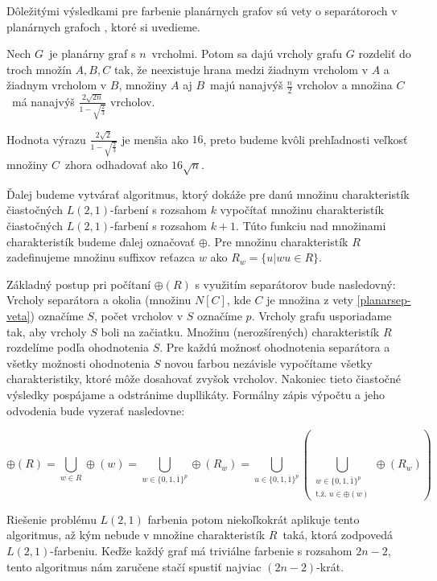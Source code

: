 Dôležitými výsledkami pre farbenie planárnych grafov sú vety o separátoroch v planárnych grafoch \cite{tarjan_plansep},
ktoré si uvedieme.

\begin{veta}
    \label{planarsep-veta}
    Nech $G$ je planárny graf s $n$ vrcholmi. Potom sa dajú vrcholy grafu $G$ rozdeliť do troch množín $A, B, C$ tak,
    že neexistuje hrana medzi žiadnym vrcholom v $A$ a žiadnym vrcholom v $B$, množiny $A$ aj $B$ majú nanajvýš $\frac{n}{2}$
    vrcholov a množina $C$ má nanajvýš $\frac{2 \sqrt{2n}}{1 - \sqrt{\frac{2}{3}}}$ vrcholov.
\end{veta}

\begin{pozn}
Hodnota výrazu $\frac{2 \sqrt{2}}{1 - \sqrt{\frac{2}{3}}}$ je menšia ako $16$, preto budeme kvôli prehľadnosti
veľkosť množiny $C$ zhora odhadovať ako $16 \sqrt{n}$.
\end{pozn}

Ďalej budeme vytvárať algoritmus, ktorý dokáže pre danú množinu charakteristík čiastočných $L(2,1)$-farbení
s rozsahom $k$ vypočítať množinu charakteristík čiastočných $L(2,1)$-farbení s rozsahom $k+1$. Túto funkciu
nad množinami charakteristík budeme ďalej označovať $\oplus$. Pre množinu charakteristík $R$ zadefinujeme
množinu suffixov reťazca $w$ ako $R_w = \{u | wu \in R \}$.

Základný postup pri počítaní $\oplus(R)$ s využitím separátorov bude nasledovný:
Vrcholy separátora a okolia (množinu $N[C]$, kde $C$ je množina z vety \ref{planarsep-veta})
označíme $S$, počet vrcholov v $S$ označíme $p$. Vrcholy grafu usporiadame tak, aby vrcholy $S$ boli na začiatku.
Množinu (nerozšírených) charakteristík $R$ rozdelíme podľa ohodnotenia $S$. Pre každú možnosť ohodnotenia separátora
a všetky možnosti ohodnotenia $S$ novou farbou nezávisle vypočítame všetky charakteristiky, ktoré môže dosahovať
zvyšok vrcholov. Nakoniec tieto čiastočné výsledky pospájame a odstránime dupllikáty.
Formálny zápis výpočtu a jeho odvodenia bude vyzerať nasledovne:

$$ \oplus(R) = \bigcup \limits_{w \in R} \oplus(w) = \bigcup \limits_{w \in \{0, 1, \bar{1}\}^p} \oplus(R_w) = \bigcup \limits_{u \in \{0, 1, \bar{1}\}^p} \left(\bigcup \limits_{\substack{w \in \{0, 1, \bar{1}\}^p\\ \textrm{t.ž. } u \in \oplus(w)}} \oplus(R_w) \right)$$

Riešenie
problému $L(2,1)$ farbenia potom niekoľkokrát aplikuje tento algoritmus, až kým nebude v množine
charakteristík $R$ taká, ktorá zodpovedá $L(2,1)$-farbeniu. Keďže každý graf má triviálne farbenie
s rozsahom $2n - 2$, tento algoritmus nám zaručene stačí spustiť najviac $(2n - 2)$-krát.

